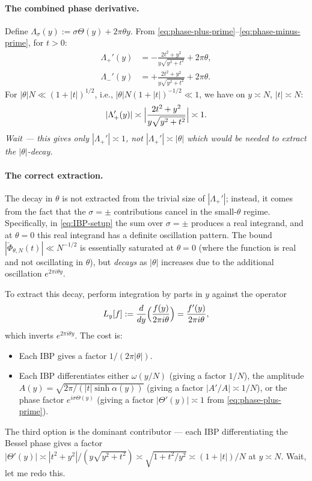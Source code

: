 \documentclass[11pt]{article}
\theoremstyle{definition}
\begin{document}
\paragraph{The combined phase derivative.}
Define $\Lambda_\sigma(y) := \sigma\Theta(y) + 2\pi\theta y$. From \eqref{eq:phase-plus-prime}--\eqref{eq:phase-minus-prime}, for $t > 0$:
\begin{align*}
    \Lambda_+'(y) &= -\frac{2t^2+y^2}{y\sqrt{y^2+t^2}} + 2\pi\theta,\\
    \Lambda_-'(y) &= +\frac{2t^2+y^2}{y\sqrt{y^2+t^2}} + 2\pi\theta.
\end{align*}
For $|\theta|N \ll (1+|t|)^{1/2}$, i.e., $|\theta|N(1+|t|)^{-1/2} \ll 1$, we have on $y \asymp N$, $|t| \asymp N$:
\[
    |\Lambda_+'(y)| \asymp \Bigl|\frac{2t^2+y^2}{y\sqrt{y^2+t^2}}\Bigr| \asymp 1.
\]
\emph{Wait — this gives only $|\Lambda_+'| \asymp 1$, not $|\Lambda_+'| \asymp |\theta|$ which would be needed to extract the $|\theta|$-decay.}

\paragraph{The correct extraction.}
The decay in $\theta$ is not extracted from the trivial size of $|\Lambda_+'|$; instead, it comes from the fact that the $\sigma = \pm$ contributions cancel in the small-$\theta$ regime. Specifically, in \eqref{eq:IBP-setup} the sum over $\sigma = \pm$ produces a real integrand, and at $\theta = 0$ this real integrand has a definite oscillation pattern. The bound $|\check\Phi_{\theta,N}(t)| \ll N^{-1/2}$ is essentially saturated at $\theta = 0$ (where the function is real and not oscillating in $\theta$), but \emph{decays} as $|\theta|$ increases due to the additional oscillation $e^{2\pi i\theta y}$.

To extract this decay, perform integration by parts in $y$ against the operator
\[
    L_y[f] := \frac{d}{dy}\Bigl(\frac{f(y)}{2\pi i\theta}\Bigr) = \frac{f'(y)}{2\pi i\theta},
\]
which inverts $e^{2\pi i\theta y}$. The cost is:
\begin{itemize}
    \item Each IBP gives a factor $1/(2\pi|\theta|)$.
    \item Each IBP differentiates either $\omega(y/N)$ (giving a factor $1/N$), the amplitude $A(y) = \sqrt{2\pi/(|t|\sinh\alpha(y))}$ (giving a factor $|A'/A| \asymp 1/N$), or the phase factor $e^{i\sigma\Theta(y)}$ (giving a factor $|\Theta'(y)| \asymp 1$ from \eqref{eq:phase-plus-prime}).
\end{itemize}
The third option is the dominant contributor — each IBP differentiating the Bessel phase gives a factor $|\Theta'(y)| \asymp |t^2+y^2|/(y\sqrt{y^2+t^2}) \asymp \sqrt{1+t^2/y^2} \asymp (1+|t|)/N$ at $y \asymp N$. Wait, let me redo this.
\end{document}
